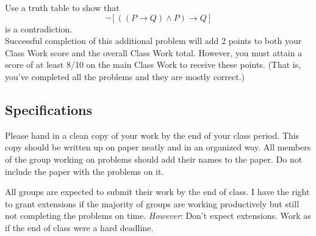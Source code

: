 \documentclass[11pt]{article}
\begin{document}
Use a truth table to show that 
\[ \neg [((P \rightarrow Q) \wedge P) \rightarrow Q] \]
is a contradiction. \\

Successful completion of this additional problem will add 2 points to both your Class Work score and the overall Class Work total. However, you must attain a score of at least 8/10 on the main Class Work to receive these points. (That is, you've completed all the problems and they are mostly correct.) 	
	
\subsection*{Specifications}

Please hand in a clean copy of your work by the end of your class period. This copy should be written up on paper neatly and in an organized way. All members of the group working on problems should add their names to the paper. Do not include the paper with the problems on it. 

All groups are expected to submit their work by the end of class. I have the right to grant extensions if the majority of groups are working productively but still not completing the problems on time. \emph{However}: Don't expect extensions. Work as if the end of class were a hard deadline. 
\end{document}
